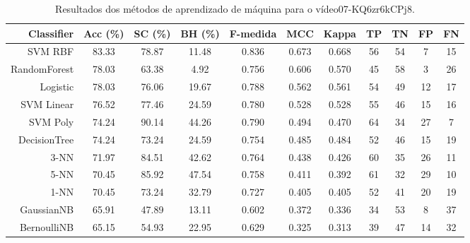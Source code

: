 \begin{table}[!htb]
\centering
\caption{Resultados dos métodos de aprendizado de máquina para o vídeo07-KQ6zr6kCPj8.}
\label{tab:07-KQ6zr6kCPj8}
\begin{tabular}{r|c|c|c|c|c|c|c|c|c|c}
\hline\hline
Classifier & Acc (\%) & SC (\%) & BH (\%) & F-medida & MCC & Kappa & TP & TN & FP & FN \\ \hline
SVM RBF & 83.33 & 78.87 & 11.48 & 0.836 & 0.673 & 0.668 & 56 & 54 & 7 & 15 \\ 
RandomForest & 78.03 & 63.38 & 4.92 & 0.756 & 0.606 & 0.570 & 45 & 58 & 3 & 26 \\ 
Logistic & 78.03 & 76.06 & 19.67 & 0.788 & 0.562 & 0.561 & 54 & 49 & 12 & 17 \\ 
SVM Linear & 76.52 & 77.46 & 24.59 & 0.780 & 0.528 & 0.528 & 55 & 46 & 15 & 16 \\ 
SVM Poly & 74.24 & 90.14 & 44.26 & 0.790 & 0.494 & 0.470 & 64 & 34 & 27 & 7 \\ 
DecisionTree & 74.24 & 73.24 & 24.59 & 0.754 & 0.485 & 0.484 & 52 & 46 & 15 & 19 \\ 
3-NN & 71.97 & 84.51 & 42.62 & 0.764 & 0.438 & 0.426 & 60 & 35 & 26 & 11 \\ 
5-NN & 70.45 & 85.92 & 47.54 & 0.758 & 0.411 & 0.392 & 61 & 32 & 29 & 10 \\ 
1-NN & 70.45 & 73.24 & 32.79 & 0.727 & 0.405 & 0.405 & 52 & 41 & 20 & 19 \\ 
GaussianNB & 65.91 & 47.89 & 13.11 & 0.602 & 0.372 & 0.336 & 34 & 53 & 8 & 37 \\ 
BernoulliNB & 65.15 & 54.93 & 22.95 & 0.629 & 0.325 & 0.313 & 39 & 47 & 14 & 32 \\ 
\hline\hline
\end{tabular}
\end{table}
